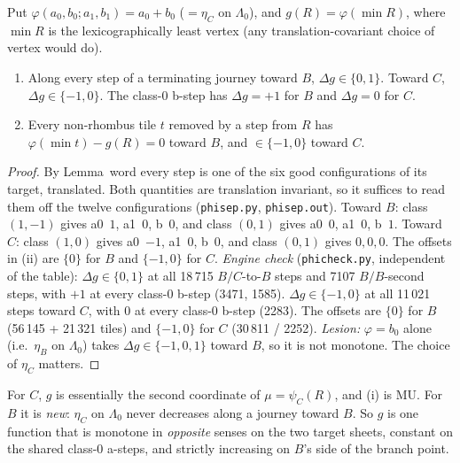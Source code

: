 \documentclass[11pt]{article}
\theoremstyle{definition}\newtheorem{definition}[theorem]{Definition}\newtheorem{remark}[theorem]{Remark}
\begin{document}
\begin{lemma}\label{lem:phi}
Put $\varphi(a_0,b_0;a_1,b_1)=a_0+b_0$ ($=\eta_C$ on $\Lambda_0$), and $g(R)=\varphi(\min R)$, where $\min R$ is the lexicographically least vertex (any translation-covariant choice of vertex would do).
\begin{enumerate}
\item[(i)] Along every step of a terminating journey toward $B$, $\Delta g\in\{0,1\}$. Toward $C$, $\Delta g\in\{-1,0\}$. The class-$0$ b-step has $\Delta g=+1$ for $B$ and $\Delta g=0$ for $C$.
\item[(ii)] Every non-rhombus tile $t$ removed by a step from $R$ has $\varphi(\min t)-g(R)=0$ toward $B$, and $\in\{-1,0\}$ toward $C$.
\end{enumerate}
\end{lemma}
\begin{proof}
By Lemma~word every step is one of the six good configurations of its target, translated. Both quantities are translation invariant, so it suffices to read them off the twelve configurations (\texttt{phisep.py}, \texttt{phisep.out}). Toward $B$: class $(1,-1)$ gives a0~$1$, a1~$0$, b~$0$, and class $(0,1)$ gives a0~$0$, a1~$0$, b~$1$. Toward $C$: class $(1,0)$ gives a0~$-1$, a1~$0$, b~$0$, and class $(0,1)$ gives $0,0,0$. The offsets in (ii) are $\{0\}$ for $B$ and $\{-1,0\}$ for $C$.
\emph{Engine check} (\texttt{phicheck.py}, independent of the table): $\Delta g\in\{0,1\}$ at all 18\,715 $B/C$-to-$B$ steps and 7107 $B/B$-second steps, with $+1$ at every class-0 b-step (3471, 1585). $\Delta g\in\{-1,0\}$ at all 11\,021 steps toward $C$, with $0$ at every class-0 b-step (2283). The offsets are $\{0\}$ for $B$ (56\,145 + 21\,321 tiles) and $\{-1,0\}$ for $C$ (30\,811 / 2252).
\emph{Lesion:} $\varphi=b_0$ alone (i.e.\ $\eta_B$ on $\Lambda_0$) takes $\Delta g\in\{-1,0,1\}$ toward $B$, so it is not monotone. The choice of $\eta_C$ matters.
\end{proof}
\noindent For $C$, $g$ is essentially the second coordinate of $\mu=\psi_C(R)$, and (i) is MU. For $B$ it is \emph{new}: $\eta_C$ on $\Lambda_0$ never decreases along a journey toward $B$. So $g$ is one function that is monotone in \emph{opposite} senses on the two target sheets, constant on the shared class-0 a-steps, and strictly increasing on $B$'s side of the branch point.
\end{document}
